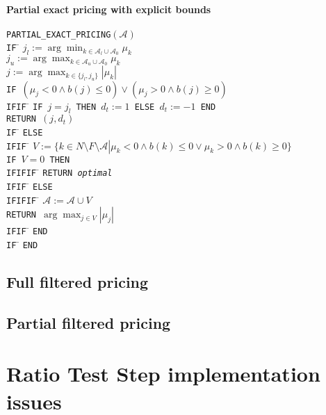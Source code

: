 \documentclass[a4paper]{article}
\begin{document}
\paragraph{Partial exact pricing with explicit bounds}
\begin{tabbing}
\texttt{PARTIAL\_EXACT\_PRICING$(\mathcal{A})$} \\
\texttt{IF} \= \kill
\> \texttt{$j_{l}:=\arg\min_{k \in \mathcal{A}_{l} \cup
                               \mathcal{A}_{0}}\mu_{k}$}  \\
\> \texttt{$j_{u}:=\arg\max_{k \in \mathcal{A}_{u} \cup
                               \mathcal{A}_{0}}\mu_{k}$}  \\
\> \texttt{$j:=\arg\max_{k \in \{j_{l}, j_{u}\}}\left|\mu_{k}\right|$}  \\
\> \texttt{IF $\left(\mu_{j} < 0 \wedge b\left(j\right) \leq 0 \right)
   \vee \left(\mu_{j} > 0 \wedge b\left(j\right) \geq 0 \right)$} \\
\texttt{IFIF} \= \kill
\> \texttt{IF $j=j_{l}$ THEN $d_{t}:=1$ ELSE $d_{t}:=-1$ END} \\
\> \texttt{RETURN $(j, d_{t})$} \\
\texttt{IF} \= \kill
\> \texttt{ELSE} \\
\texttt{IFIF} \= \kill
\> \texttt{$V:=\{k \in N \setminus F \setminus \mathcal{A} \left|\right.
    \mu_{k} < 0 \wedge b\left(k\right) \leq 0 \vee
    \mu_{k} > 0 \wedge b\left(k\right) \geq 0\}$} \\
\> \texttt{IF $V=0$ THEN} \\
\texttt{IFIFIF} \= \kill  
\> \texttt{RETURN \emph{optimal}} \\
\texttt{IFIF} \= \kill
\> \texttt{ELSE} \\
\texttt{IFIFIF} \= \kill
\> \texttt{$\mathcal{A}:=\mathcal{A} \cup V$} \\
\> \texttt{RETURN $\arg\max_{j \in V}\left|\mu_{j}\right|$} \\
\texttt{IFIF} \= \kill
\> \texttt{END} \\
\texttt{IF} \= \kill
\> \texttt{END}
\end{tabbing}
\subsection{Full filtered pricing}
\subsection{Partial filtered pricing}

\section{Ratio Test Step implementation issues}
\end{document}
